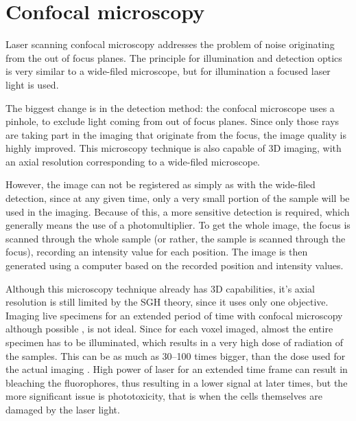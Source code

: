\documentclass{tdk_style}
\begin{document}
\section{Confocal microscopy}

Laser scanning confocal microscopy \cite{davidovits_photomicrography_1973} addresses the problem of noise originating from the out of focus planes. The principle for illumination and detection optics is very similar to a wide-filed microscope, but for illumination a focused laser light is used.

The biggest change is in the detection method: the confocal microscope uses a pinhole, to exclude light coming from out of focus planes. Since only those rays are taking part in the imaging that originate from the focus, the image quality is highly improved. This microscopy technique is also capable of 3D imaging, with an axial resolution corresponding to a wide-filed microscope.

However, the image can not be registered as simply as with the wide-filed detection, since at any given time, only a very small portion of the sample will be used in the imaging. Because of this, a more sensitive detection is required, which generally means the use of a photomultiplier. To get the whole image, the focus is scanned through the whole sample (or rather, the sample is scanned through the focus), recording an intensity value for each position. The image is then generated using a computer based on the recorded position and intensity values.


Although this microscopy technique already has 3D capabilities, it's axial resolution is still limited by the SGH theory, since it uses only one objective. Imaging live specimens for an extended period of time with confocal microscopy although possible \cite{aldaz_live_2010}, is not ideal. Since for each voxel imaged, almost the entire specimen has to be illuminated, which results in a very high dose of radiation of the samples. This can be as much as 30--100 times bigger, than the dose used for the actual imaging \cite{reynaud_light_2008}. High power of laser for an extended time frame can result in bleaching the fluorophores, thus resulting in a lower signal at later times, but the more significant issue is phototoxicity, that is when the cells themselves are damaged by the laser light.
\end{document}
